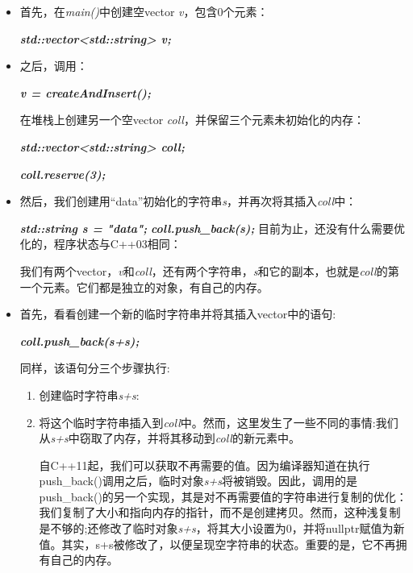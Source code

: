 \begin{itemize}
  \item 首先，在\textit{main()}中创建空vector \textit{v}，包含0个元素：\par
  \textit{\textbf{std::\allowbreak{}vector<\allowbreak{}std::\allowbreak{}string> v;}}
  \item 之后，调用：\par
  \textit{\textbf{v =\allowbreak{} createAndInsert(\allowbreak{})\allowbreak{};}}\par
  在堆栈上创建另一个空vector \textit{coll}，并保留三个元素未初始化的内存：\par
  \textit{\textbf{std::\allowbreak{}vector<\allowbreak{}std::\allowbreak{}string> coll;}}\par
  \textit{\textbf{coll.reserve(\allowbreak{}3)\allowbreak{};}}\par
  \item 然后，我们创建用“data”初始化的字符串\textit{s}，并再次将其插入\textit{coll}中：\par
  \textit{\textbf{std::\allowbreak{}string s =\allowbreak{} "data";}}
  \textit{\textbf{coll.push\_\allowbreak{}back(\allowbreak{}s)\allowbreak{};}}
  目前为止，还没有什么需要优化的，程序状态与C++03相同：\par
{}
  我们有两个vector，\textit{v}和\textit{coll}，还有两个字符串，\textit{s}和它的副本，也就是\textit{coll}的第一个元素。它们都是独立的对象，有自己的内存。\par
  \item 首先，看看创建一个新的临时字符串并将其插入vector中的语句:\par
  \textit{\textbf{coll.push\_\allowbreak{}back(\allowbreak{}s+s)\allowbreak{};}}\par
  同样，该语句分三个步骤执行:\par
  \begin{enumerate}
    \item 创建临时字符串\textit{s+s}:\par
{}
    \item 将这个临时字符串插入到\textit{coll}中。然而，这里发生了一些不同的事情:我们从\textit{s+s}中窃取了内存，并将其移动到\textit{coll}的新元素中。\par
{}
    自C++11起，我们可以获取不再需要的值。因为编译器知道在执行push\_back()调用之后，临时对象\textit{s+s}将被销毁。因此，调用的是push\_back()的另一个实现，其是对不再需要值的字符串进行复制的优化：我们复制了大小和指向内存的指针，而不是创建拷贝。然而，这种浅复制是不够的;还修改了临时对象\textit{s+s}，将其大小设置为0，并将nullptr赋值为新值。其实，s+s被修改了，以便呈现空字符串的状态。重要的是，它不再拥有自己的内存。

\end{enumerate}
\end{itemize}
